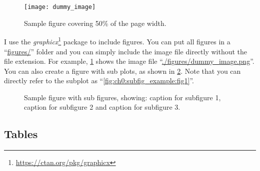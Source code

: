 \begin{figure}[htb]
    \centering
    \texttt{[image: dummy\_image]}
    \caption[Sample figure covering 50\% of the page width]
    {
        Sample figure covering 50\% of the page width.
        \label{fig:ch0:sample_image}
    }
\end{figure}


I use the \textit{graphicx}\footnote{\url{https://ctan.org/pkg/graphicx}} package to include figures. You can put all figures in a ``\url{figures/}'' folder and you can simply include the image file directly without the file extension. For example, \cref{fig:ch0:sample_image} shows the image file ``\url{./figures/dummy_image.png}''. You can also create a figure with sub plots, as shown in \cref{fig:ch0:subfig_example}. Note that you can directly refer to the subplot as ``\cref{fig:ch0:subfig_example:fig1}''.


\begin{figure}
    \centering
    \caption[Sample figure with sub figures]
    {
        Sample figure with sub figures, showing:
         caption for subfigure 1,
         caption for subfigure 2 and
         caption for subfigure 3.
        \label{fig:ch0:subfig_example}
    }
\end{figure}


\subsection{Tables}


